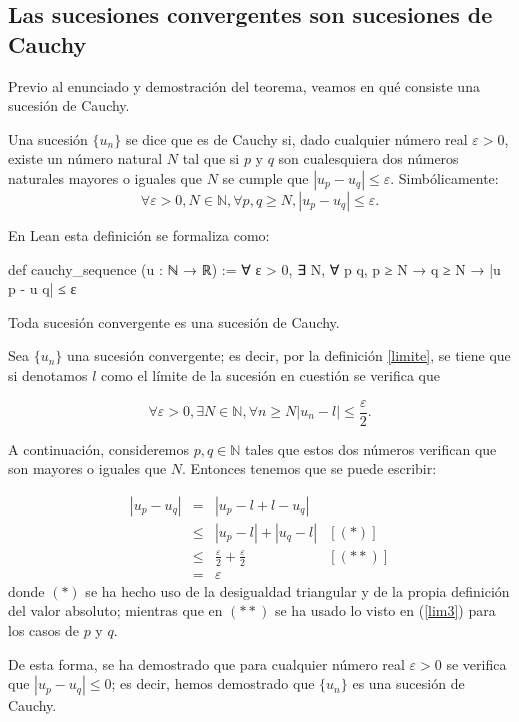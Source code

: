 \subsection{Las sucesiones convergentes son sucesiones de Cauchy}

Previo al enunciado y demostración del teorema, veamos en qué consiste
una sucesión de Cauchy.

\begin{definicion}
  Una sucesión \(\{u_n\}\) se dice que es de Cauchy si, dado cualquier
  número real \(ε > 0\), existe un número natural \(N\) tal que si \(p\)
  y \(q\) son cualesquiera dos números naturales mayores o iguales que
  \(N\) se cumple que \(|u_p - u_q| ≤ ε\). Simbólicamente:
  \begin{equation}
  ∀ ε > 0, N ∈ ℕ, ∀ p, q ≥ N, |u_p - u_q| ≤ ε.
  \end{equation}
\end{definicion}

En Lean esta definición se formaliza como:
\begin{leancode}
def cauchy_sequence (u : ℕ → ℝ) :=
∀ ε > 0, ∃ N, ∀ p q, p ≥ N → q ≥ N → |u p - u q| ≤ ε
\end{leancode}

\begin{teorema}
  Toda sucesión convergente es una sucesión de Cauchy.
\end{teorema}
\begin{demostracion}
  Sea \(\{u_n\}\) una sucesión convergente; es decir, por la definición
  \ref{limite}, se tiene que si denotamos \(l\) como el límite de la
  sucesión en cuestión se verifica que

  \begin{equation}\label{lim3}
  ∀ ε > 0, ∃ N ∈ ℕ, ∀ n ≥ N |u_n-l| ≤ \frac{ε}{2}.
  \end{equation}

  A continuación, consideremos \(p,q ∈ ℕ\) tales que estos dos números
  verifican que son mayores o iguales que \(N\). Entonces tenemos que se
  puede escribir:

  \[\begin{array}{llll}
      |u_p-u_q| &= &|u_p-l+l-u_q|           & \\
                &≤ &|u_p-l|+|u_q-l|         & [(*)] \\
                &≤ &\frac{ε}{2}+\frac{ε}{2} & [(**)] \\
                &= &ε
  \end{array}\]
  donde \((*)\) se ha hecho uso de la desigualdad triangular y de la
  propia definición del valor absoluto; mientras que en \((**)\) se ha
  usado lo visto en (\ref{lim3}) para los casos de \(p\) y \(q\).

  De esta forma, se ha demostrado que para cualquier número real \(ε > 0\)
  se verifica que \(|u_p - u_q| ≤ 0\); es decir, hemos demostrado
  que \(\{u_n\}\) es una sucesión de Cauchy.
\end{demostracion}

